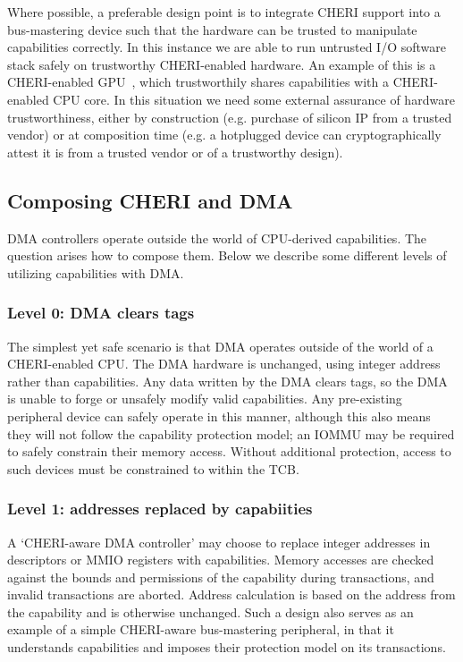 Where possible, a preferable design point is to integrate CHERI support into a bus-mastering device such that the hardware can be trusted to manipulate capabilities correctly.
In this instance we are able to run untrusted I/O software stack safely on trustworthy CHERI-enabled hardware.
An example of this is a CHERI-enabled GPU~\cite{UCAM-CL-TR-997,naylor26-simtight}, which trustworthily shares capabilities with a CHERI-enabled CPU core.
In this situation we need some external assurance of hardware trustworthiness, either by construction (e.g. purchase of silicon IP from a trusted vendor) or at composition time (e.g. a hotplugged device can cryptographically attest it is from a trusted vendor or of a trustworthy design).

\subsection{Composing CHERI and DMA}
DMA controllers operate outside the world of CPU-derived capabilities.
The question arises how to compose them.
Below we describe some different levels of utilizing capabilities with DMA.

\subsubsection{Level 0: DMA clears tags}
The simplest yet safe scenario is that DMA operates outside of the world of a CHERI-enabled CPU.
The DMA hardware is unchanged, using integer address rather than capabilities.
Any data written by the DMA clears tags, so the DMA is unable to forge or unsafely modify valid capabilities.
Any pre-existing peripheral device can safely operate in this manner, although this also means they will not follow the capability protection model; an IOMMU may be required to safely constrain their memory access.
Without additional protection, access to such devices must be constrained to within the TCB.

\subsubsection{Level 1: addresses replaced by capabiities}
A `CHERI-aware DMA controller' may choose to replace integer addresses in descriptors or MMIO registers with capabilities.
Memory accesses are checked against the bounds and permissions of the capability during transactions, and invalid transactions are aborted.
Address calculation is based on the address from the capability and is otherwise unchanged.
Such a design also serves as an example of a simple CHERI-aware bus-mastering peripheral, in that it understands capabilities and imposes their protection model on its transactions.

